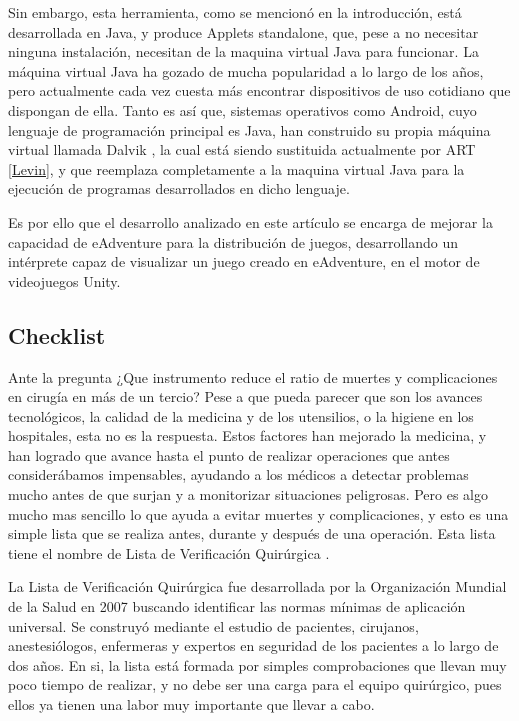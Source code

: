 Sin embargo, esta herramienta, como se mencionó en la introducción, está desarrollada en Java, y produce Applets standalone, que, pese a no necesitar ninguna instalación, necesitan de la maquina virtual Java para funcionar. La máquina virtual Java ha gozado de mucha popularidad a lo largo de los años, pero actualmente cada vez cuesta más encontrar dispositivos de uso cotidiano que dispongan de ella. Tanto es así que, sistemas operativos como Android, cuyo lenguaje de programación principal es Java, han construido su propia máquina virtual llamada Dalvik \cite{Report2009}, la cual está siendo sustituida actualmente por ART \ref{Levin}, y que reemplaza completamente a la maquina virtual Java para la ejecución de programas desarrollados en dicho lenguaje.

Es por ello que el desarrollo analizado en este artículo se encarga de mejorar la capacidad de eAdventure para la distribución de juegos, desarrollando un intérprete capaz de visualizar un juego creado en eAdventure, en el motor de videojuegos Unity. 


\subsection{Checklist}
\label{checklist}

Ante la pregunta ¿Que instrumento reduce el ratio de muertes y complicaciones en cirugía en más de un tercio? Pese a que pueda parecer que son los avances tecnológicos, la calidad de la medicina y de los utensilios, o la higiene en los hospitales, esta no es la respuesta. Estos factores han mejorado la medicina, y han logrado que avance hasta el punto de realizar operaciones que antes considerábamos impensables, ayudando a los médicos a detectar problemas mucho antes de que surjan y a monitorizar situaciones peligrosas. Pero es algo mucho mas sencillo lo que ayuda a evitar muertes y complicaciones, y esto es una simple lista que se realiza antes, durante y después de una operación. Esta lista tiene el nombre de Lista de Verificación Quirúrgica \cite{baltaslide}.

La Lista de Verificación Quirúrgica fue desarrollada por la Organización Mundial de la Salud en 2007 buscando identificar las normas mínimas de aplicación universal. Se construyó mediante el estudio de pacientes, cirujanos, anestesiólogos, enfermeras y expertos en seguridad de los pacientes a lo largo de dos años. En si, la lista está formada por simples comprobaciones que llevan muy poco tiempo de realizar, y no debe ser una carga para el equipo quirúrgico, pues ellos ya tienen una labor muy importante que llevar a cabo.

